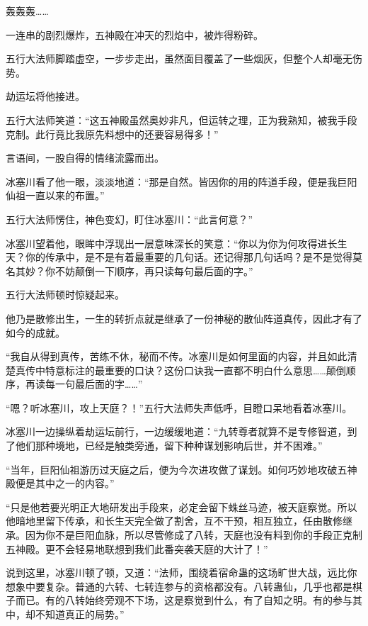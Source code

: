 
\begin{this_body}



轰轰轰……

一连串的剧烈爆炸，五神殿在冲天的烈焰中，被炸得粉碎。

五行大法师脚踏虚空，一步步走出，虽然面目覆盖了一些烟灰，但整个人却毫无伤势。

劫运坛将他接进。

五行大法师笑道：“这五神殿虽然奥妙非凡，但运转之理，正为我熟知，被我手段克制。此行竟比我原先料想中的还要容易得多！”

言语间，一股自得的情绪流露而出。

冰塞川看了他一眼，淡淡地道：“那是自然。皆因你的用的阵道手段，便是我巨阳仙祖一直以来的布置。”

五行大法师愣住，神色变幻，盯住冰塞川：“此言何意？”

冰塞川望着他，眼眸中浮现出一层意味深长的笑意：“你以为你为何攻得进长生天？你的传承中，是不是有着最重要的几句话。还记得那几句话吗？是不是觉得莫名其妙？你不妨颠倒一下顺序，再只读每句最后面的字。”

五行大法师顿时惊疑起来。

他乃是散修出生，一生的转折点就是继承了一份神秘的散仙阵道真传，因此才有了如今的成就。

“我自从得到真传，苦练不休，秘而不传。冰塞川是如何里面的内容，并且如此清楚真传中特意标注的最重要的口诀？这份口诀我一直都不明白什么意思……颠倒顺序，再读每一句最后面的字……”

“嗯？听冰塞川，攻上天庭？！”五行大法师失声低呼，目瞪口呆地看着冰塞川。

冰塞川一边操纵着劫运坛前行，一边缓缓地道：“九转尊者就算不是专修智道，到了他们那种境地，已经是触类旁通，留下种种谋划影响后世，并不困难。”

“当年，巨阳仙祖游历过天庭之后，便为今次进攻做了谋划。如何巧妙地攻破五神殿便是其中之一的内容。”

“只是他若要光明正大地研发出手段来，必定会留下蛛丝马迹，被天庭察觉。所以他暗地里留下传承，和长生天完全做了割舍，互不干预，相互独立，任由散修继承。因为你不是巨阳血脉，所以尽管修成了八转，天庭也没有料到你的手段正克制五神殿。更不会轻易地联想到我们此番突袭天庭的大计了！”

说到这里，冰塞川顿了顿，又道：“法师，围绕着宿命蛊的这场旷世大战，远比你想象中要复杂。普通的六转、七转连参与的资格都没有。八转蛊仙，几乎也都是棋子而已。有的八转始终旁观不下场，这是察觉到什么，有了自知之明。有的参与其中，却不知道真正的局势。”


\end{this_body}
